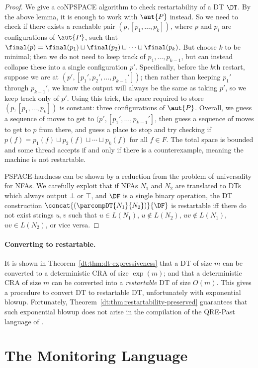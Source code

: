 \begin{proof}
We give a coNPSPACE algorithm to check restartability of a DT $\DT$. By the above lemma, it is enough to work with $\aut{P}$ instead.
So we need to check if there exists
a reachable pair $(p, [p_1,\ldots,p_k])$,
where $p$ and $p_i$ are configurations of $\aut{P}$,
such that
$\final(p) = \final(p_1) \sqcup \final(p_2) \sqcup \cdots \sqcup \final(p_k)$.
But choose $k$ to be minimal;
then we do not need to keep track of $p_1, \ldots, p_{k-1}$,
but can instead collapse these into a single configuration $p'$.
Specifically, before the $k$th restart,
suppose we are at $(p', [p_1',p_2',\ldots, p_{k-1}'])$;
then rather than keeping $p_1'$ through $p_{k-1}'$,
we know the output will always be the same as taking $p'$,
so we keep track only of $p'$.
Using this trick, the space required to store
$(p, [p_1, \ldots, p_k])$ is constant: three configurations of $\aut{P}$.
Overall, we guess a sequence of moves to get
to $(p', [p_1', \ldots, p_{k-1}']$,
then guess a sequence of moves to get to $p$ from there,
and guess a place to stop and try checking if
$p(f) = p_1(f) \sqcup p_2(f) \sqcup \cdots \sqcup p_k(f)$ for all $f \in F$.
The total space is bounded and some thread accepts if and only if there is a counterexample,
meaning the machine is not restartable.

PSPACE-hardness can be shown by a reduction from the problem of universality for NFAs.
We carefully exploit that if
NFAs $N_1$ and $N_2$ are translated to DTs which always output $\bot$ or $\top$,
and $\DF$ is a single binary operation,
the DT construction $\concat{(\parcompDT{N_1}{N_2})}{\DF}$ is restartable iff
there do not exist strings $u, v$ such that
$u \in L(N_1)$, $u \notin L(N_2)$, $uv \notin L(N_1)$, $uv \in L(N_2)$, or vice versa.
\end{proof}

\paragraph*{Converting to restartable.}
It is shown in Theorem~\ref{dt:thm:dt-expressiveness} that a DT of size $m$ can be converted to a deterministic CRA of size $\exp(m)$; and that a deterministic CRA of size $m$ can be converted into a \emph{restartable} DT of size $O(m)$. This gives a procedure to convert DT to restartable DT, unfortunately with exponential blowup. Fortunately, Theorem~\ref{dt:thm:restartability-preserved} guarantees that such exponential blowup does not arise in the compilation of the QRE-Past language of .

\section{The \QREpast{} Monitoring Language}
\label{dt:sec:rm}

